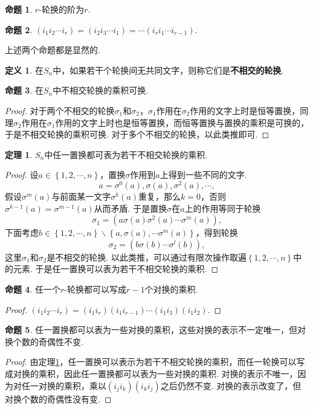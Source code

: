 \documentclass[12pt]{ctexart}
\theoremstyle{definition}
\newtheorem{definition}{定义}
\newtheorem{theorem}{定理}
\newtheorem{proposition}{命题}
\theoremstyle{plain}
\begin{document}
	\begin{proposition}
		$r$-轮换的阶为$r$.
	\end{proposition}
	\begin{proposition}
		$(i_1i_2\cdots i_r)=(i_2i_3\cdots i_1)=\cdots (i_ri_1\cdots i_{r-1})$.
	\end{proposition}
	上述两个命题都是显然的.
	\begin{definition}
		在$S_n$中，如果若干个轮换间无共同文字，则称它们是\textbf{不相交的轮换}.
	\end{definition}
	\begin{proposition}
		在$S_n$中不相交轮换的乘积可换.
	\end{proposition}
	\begin{proof}
		对于两个不相交的轮换$\sigma_1$和$\sigma_2$，$\sigma_1$作用在$\sigma_2$作用的文字上时是恒等置换，同理$\sigma_2$作用在$\sigma_1$作用的文字上时也是恒等置换，而恒等置换与置换的乘积是可换的，于是不相交轮换的乘积可换. 对于多个不相交的轮换，以此类推即可.
	\end{proof}
	\begin{theorem}\label{permutationtocycle}
		$S_n$中任一置换都可表为若干不相交轮换的乘积.
	\end{theorem}
	\begin{proof}
		设$a\in\left\{1,2,\cdots,n\right\}$，置换$\sigma$作用到$a$上得到一些不同的文字.
		$$a=\sigma^{0}(a),\sigma(a),\sigma^2(a),\cdots,$$
		假设$\sigma^m(a)$与前面某一文字$\sigma^k(a)$重复，那么$k=0$，否则$\sigma^{k-1}(a)=\sigma^{m-1}(a)$从而矛盾. 于是置换$\sigma$在$a$上的作用等同于轮换
		$$\sigma_1=(a\sigma(a)\sigma^2(a)\cdots\sigma^{m}(a)),$$
		下面考虑$b\in\left\{1,2,\cdots,n\right\}\backslash\left\{a,\sigma(a),\cdots\sigma^m(a)\right\}$，得到轮换
		$$\sigma_2=(b\sigma(b)\cdots\sigma^l(b)),$$
		这里$\sigma_1$和$\sigma_2$是不相交的轮换. 以此类推，可以通过有限次操作取遍$\left\{1,2,\cdots,n\right\}$中的元素. 于是任一置换可以表为若干不相交轮换的乘积.
	\end{proof}
	\begin{proposition}
		任一个$r$-轮换都可以写成$r-1$个对换的乘积.
	\end{proposition}
	\begin{proof}
		$(i_1i_2\cdots i_r)=(i_1i_r)(i_1i_{r-1})\cdots(i_1i_3)(i_1i_2)$.
	\end{proof}
	\begin{proposition}
		任一置换都可以表为一些对换的乘积，这些对换的表示不一定唯一，但对换个数的奇偶性不变.
	\end{proposition}
	\begin{proof}
		由定理\ref{permutationtocycle}，任一置换可以表示为若干不相交轮换的乘积，而任一轮换可以写成对换的乘积，因此任一置换都可以表为一些对换的乘积. 对换的表示不唯一，因为对任一对换的乘积，乘以$(i_ji_k)(i_ki_j)$之后仍然不变. 对换的表示改变了，但对换个数的奇偶性没有变.
	\end{proof}
\end{document}
